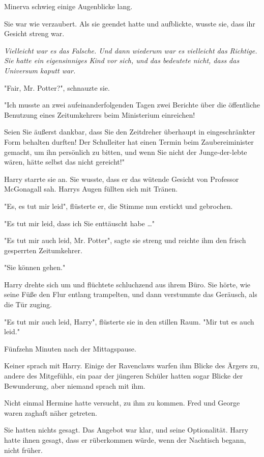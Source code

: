 {Minerva schwieg einige Augenblicke lang.

Sie war wie verzaubert. Als sie geendet hatte und aufblickte, wusste sie, dass ihr Gesicht streng war.

\emph{Vielleicht war es das Falsche. Und dann wiederum war es vielleicht das Richtige. Sie hatte ein eigensinniges Kind vor sich, und das bedeutete nicht, dass das Universum kaputt war.}

"Fair, Mr. Potter?", schnauzte sie.

"Ich musste an zwei aufeinanderfolgenden Tagen zwei Berichte über die öffentliche Benutzung eines Zeitumkehrers beim Ministerium einreichen!

Seien Sie äußerst dankbar, dass Sie den Zeitdreher überhaupt in eingeschränkter Form behalten durften! Der Schulleiter hat einen Termin beim Zaubereiminister gemacht, um ihn persönlich zu bitten, und wenn Sie nicht der Junge-der-lebte wären, hätte selbst das nicht gereicht!"

Harry starrte sie an. Sie wusste, dass er das wütende Gesicht von Professor McGonagall sah. Harrys Augen füllten sich mit Tränen.

"Es, es tut mir leid", flüsterte er, die Stimme nun erstickt und gebrochen.

"Es tut mir leid, dass ich Sie enttäuscht habe …"

"Es tut mir auch leid, Mr. Potter", sagte sie streng und reichte ihm den frisch gesperrten Zeitumkehrer.

"Sie können gehen."

Harry drehte sich um und flüchtete schluchzend aus ihrem Büro. Sie hörte, wie seine Füße den Flur entlang trampelten, und dann verstummte das Geräusch, als die Tür zuging.

"Es tut mir auch leid, Harry", flüsterte sie in den stillen Raum. "Mir tut es auch leid."

Fünfzehn Minuten nach der Mittagspause.

Keiner sprach mit Harry. Einige der Ravenclaws warfen ihm Blicke des Ärgers zu, andere des Mitgefühls, ein paar der jüngeren Schüler hatten sogar Blicke der Bewunderung, aber niemand sprach mit ihm.

Nicht einmal Hermine hatte versucht, zu ihm zu kommen. Fred und George waren zaghaft näher getreten.

Sie hatten nichts gesagt. Das Angebot war klar, und seine Optionalität. Harry hatte ihnen gesagt, dass er rüberkommen würde, wenn der Nachtisch begann, nicht früher.

}
